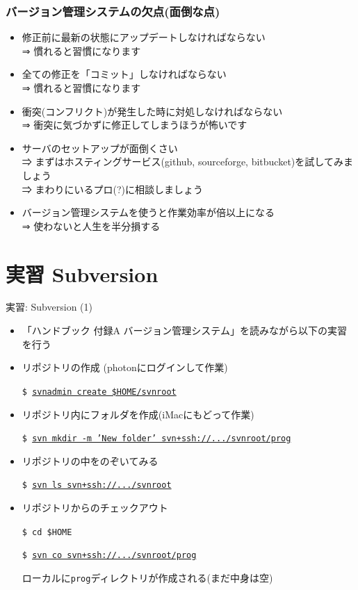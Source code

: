 \documentclass[10pt,dvipdfmx]{beamer}
\begin{document}
\begin{frame}
  \frametitle{バージョン管理システムの欠点(面倒な点)}
  \begin{itemize}
  \item 修正前に最新の状態にアップデートしなければならない \\
   ⇒ 慣れると習慣になります
  \item 全ての修正を「コミット」しなければならない \\
    ⇒ 慣れると習慣になります
  \item 衝突(コンフリクト)が発生した時に対処しなければならない \\
    ⇒ 衝突に気づかずに修正してしまうほうが怖いです
  \item サーバのセットアップが面倒くさい \\
    ⇒ まずはホスティングサービス(github, sourceforge, bitbucket)を試してみましょう \\
    ⇒ まわりにいるプロ(?)に相談しましょう \\[.5em]
  \item バージョン管理システムを使うと作業効率が倍以上になる \\
    ⇒ {\color{red} 使わないと人生を半分損する}
  \end{itemize}
\end{frame}

\section{実習 Subversion}

\begin{frame}[t,fragile]{実習: Subversion (1)}
  \begin{itemize}
  \item 「ハンドブック 付録A バージョン管理システム」を読みながら以下の実習を行う
  \item リポジトリの作成 (photonにログインして作業)

    {\tt \$ \underline{svnadmin create \$HOME/svnroot}}
  \item リポジトリ内にフォルダを作成(iMacにもどって作業)

    {\tt \$~\underline{svn mkdir -m 'New folder' svn+ssh://.../svnroot/prog}}
  \item リポジトリの中をのぞいてみる

    {\tt \$ \underline{svn ls svn+ssh://.../svnroot}}

  \item リポジトリからのチェックアウト

    {\tt \$ cd \$HOME}
    
    {\tt \$ \underline{svn co svn+ssh://.../svnroot/prog}}

    ローカルに{\tt prog}ディレクトリが作成される(まだ中身は空)
  \end{itemize}
\end{frame}
\end{document}
